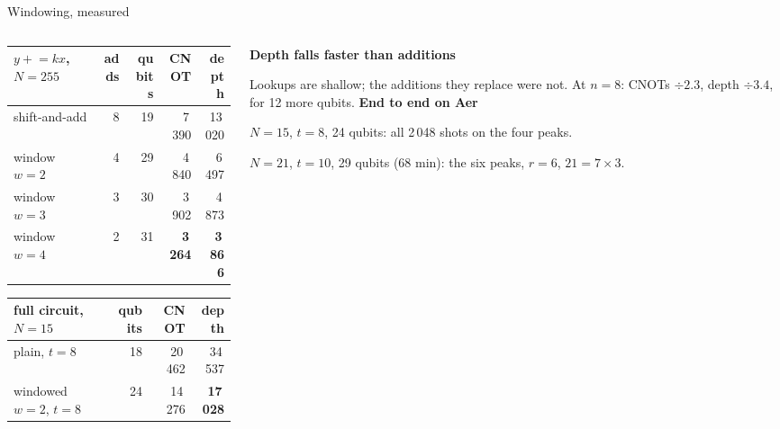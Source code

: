 \documentclass[aspectratio=169,11pt]{beamer}
\newcommand{\blocktitle}[1]{{\bfseries #1}\par\vskip1mm}
\begin{document}
\begin{frame}{Windowing, measured}
  \begin{columns}[T]
    \begin{column}{0.55\textwidth}
      \centering\footnotesize
      \renewcommand{\arraystretch}{1.08}
      \begin{tabular}{@{}lrrrr@{}}
        \toprule
        $y\mathrel{+}=kx$, $N=255$ & adds & qubits & CNOT & depth \\
        \midrule
        shift-and-add & 8 & 19 & 7\,390 & 13\,020 \\
        window $w=2$ & 4 & 29 & 4\,840 & 6\,497 \\
        window $w=3$ & 3 & 30 & 3\,902 & 4\,873 \\
        window $w=4$ & 2 & 31 & \textbf{3\,264} & \textbf{3\,866} \\
        \bottomrule
      \end{tabular}\par
      \vskip3mm
      \begin{tabular}{@{}lrrr@{}}
        \toprule
        full circuit, $N=15$ & qubits & CNOT & depth \\
        \midrule
        plain, $t=8$ & 18 & 20\,462 & 34\,537 \\
        windowed $w=2$, $t=8$ & 24 & 14\,276 & \textbf{17\,028} \\
        \bottomrule
      \end{tabular}
    \end{column}
    \begin{column}{0.41\textwidth}
      \small
      \blocktitle{Depth falls faster than additions}
      Lookups are shallow; the additions they replace were not. At $n=8$: CNOTs $\div2.3$, depth $\div3.4$, for 12 more qubits.
      \vskip1.5mm
      \blocktitle{End to end on Aer}
      $N=15$, $t=8$, 24 qubits: all 2\,048 shots on the four peaks.\par
      $N=21$, $t=10$, 29 qubits (68 min): the six peaks, $r=6$, $21=7\times3$.
    \end{column}
  \end{columns}
\end{frame}
\end{document}
